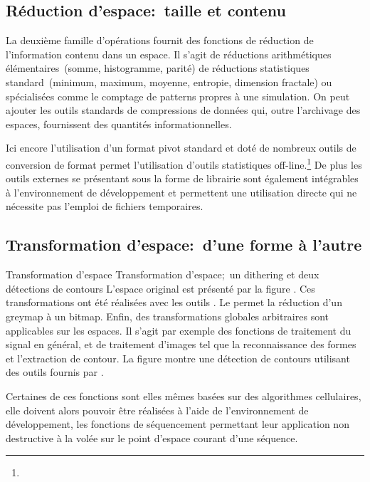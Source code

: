 \subsection{R\'eduction d'espace:~taille et contenu}

La deuxi\`eme famille d'op\'erations fournit des fonctions de r\'eduction de
l'information contenu dans un espace. %
Il s'agit de r\'eductions arithm\'etiques \'el\'ementaires~(somme,
histogramme, parit\'e) de r\'eductions statistiques standard~(minimum,
maximum, moyenne, entropie, dimension fractale) ou sp\'ecialis\'ees comme
le comptage de patterns propres \`a une simulation. %
On peut ajouter les outils standards de compressions de donn\'ees qui,
outre l'archivage des espaces, fournissent des quantit\'es
informationnelles.

\noindent Ici encore l'utilisation d'un format pivot standard et dot\'e
de nombreux outils de conversion de format permet l'utilisation
d'outils statistiques off-line.\footnote{%
  } %
De plus les outils externes se pr\'esentant sous la forme de librairie
sont \'egalement int\'egrables \`a l'environnement de d\'eveloppement et
permettent une utilisation directe qui ne n\'ecessite pas l'emploi de
fichiers temporaires.

\subsection{Transformation d'espace:~d'une forme \`a l'autre}

%
{Transformation d'espace}%
{Transformation d'espace;~un dithering et deux d\'etections de contours}%
{L'espace original est pr\'esent\'e par la figure . %
  Ces transformations ont \'et\'e r\'ealis\'ees avec les outils .
  Le  permet la r\'eduction d'un greymap \`a un bitmap.}
Enfin, des transformations globales arbitraires sont applicables sur
les espaces. %
Il s'agit par exemple des fonctions de traitement du signal en
g\'en\'eral, et de traitement d'images tel que la reconnaissance des
formes et l'extraction de contour. %
La figure  montre une d\'etection de contours
utilisant des outils fournis par . %

Certaines de ces fonctions sont elles m\^emes bas\'ees sur des algorithmes
cellulaires, elle doivent alors pouvoir \^etre r\'ealis\'ees \`a l'aide de
l'environnement de d\'eveloppement, les fonctions de s\'equencement
permettant leur application non destructive \`a la vol\'ee sur le point
d'espace courant d'une s\'equence.

